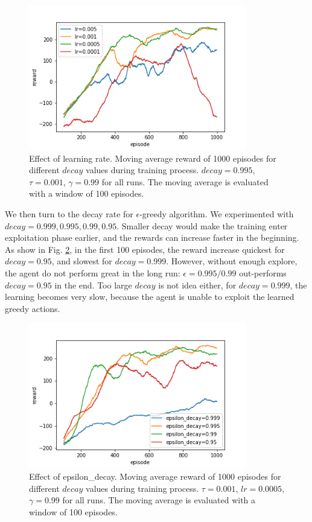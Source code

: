 \documentclass[conference]{IEEEtran}
\begin{document}
	\begin{figure}
		\includegraphics[height=2.5in]{figures/lr.png} 
		\caption{Effect of learning rate. Moving average reward of 1000 episodes for different $decay$ values during training process. $decay=0.995$, $\tau=0.001$, $\gamma=0.99$ for all runs. The moving average is evaluated with a window of 100 episodes.}
		\label{fig:lr}
	\end{figure}

We then turn to the decay rate for $\epsilon$-greedy algorithm. We experimented with $decay = 0.999, 0.995, 0.99, 0.95$. Smaller decay would make the training enter exploitation phase earlier, and the rewards can increase faster in the beginning. As show in Fig. \ref{fig:epsilon_decay}, in the first 100 episodes, the reward increase quickest for $decay = 0.95$, and slowest for $decay = 0.999$. However, without enough explore, the agent do not perform great in the long run: $\epsilon = 0.995/0.99$ out-performs $decay = 0.95$ in the end. Too large $decay$ is not idea either, for $decay = 0.999$, the learning becomes very slow, because the agent is unable to exploit the learned greedy actions.

	\begin{figure}
		\includegraphics[height=2.5in]{figures/epsilon_decay.png} 
		\caption{Effect of epsilon\_decay. Moving average reward of 1000 episodes for different $decay$ values during training process. $\tau=0.001$, $lr=0.0005$, $\gamma=0.99$ for all runs. The moving average is evaluated with a window of 100 episodes.}
		\label{fig:epsilon_decay}
	\end{figure}
	
\end{document}
